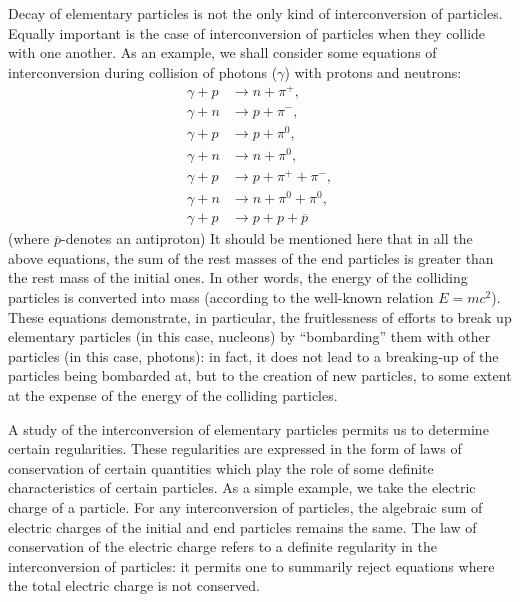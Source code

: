 \documentclass[a4paper,sfsidenotes,colorlinks=true]{tufte-book}
\numberwithin{equation}{section}
\numberwithin{figure}{section}
\begin{document}
Decay of elementary particles is not the only kind of interconversion
of particles. Equally important is the case of interconversion of
particles when they collide with one another. As an example, we shall
consider some equations of interconversion during collision of photons
($\gamma$) with protons and neutrons: 
\begin{align*}
\gamma  + p &\to n + \pi^{+}, \\
\gamma + n &\to p + \pi^{-}, \\
\gamma + p &\to p + \pi^{0},\\
\gamma + n &\to n +  \pi^{0},\\
 \gamma +p &\to p + \pi^{+} + \pi^{-},\\
 \gamma +n &\to n + \pi^{0} + \pi^{0},\\
\gamma +p &\to p + p + \overline{p} 
\end{align*}
(where $\overline{p}$-denotes an antiproton) It should be mentioned
here that in all the above equations, the sum of the rest masses of
the end particles is greater than the rest mass of the initial
ones. In other words, the energy of the colliding particles is
converted into mass (according to the well-known relation $E =
mc^{2}$). These equations demonstrate, in particular, the
fruitlessness of efforts to break up elementary particles (in this
case, nucleons) by ``bombarding'' them with other particles (in this
case, photons): in fact, it does not lead to a breaking-up of the
particles being bombarded at, but to the creation of new particles, to
some extent at the expense of the energy of the colliding particles.

A study of the interconversion of elementary particles permits us to
determine certain regularities. These regularities are expressed in
the form of laws of conservation of certain quantities which play the
role of some definite characteristics of certain particles. As a
simple example, we take the electric charge of a particle. For any
interconversion of particles, the algebraic sum of electric charges
of the initial and end particles remains the same. The law of
conservation of the electric charge refers to a definite regularity in
the interconversion of particles: it permits one to summarily reject
equations where the total electric charge is not conserved.  
\end{document}
